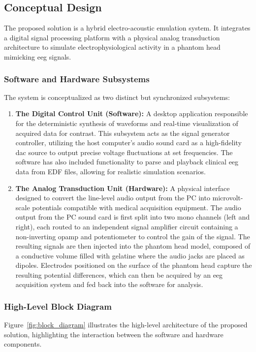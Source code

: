 \documentclass[../00_Main.tex]{subfiles}
\begin{document}
\subsection{Conceptual Design}
The proposed solution is a hybrid electro-acoustic emulation system. It integrates a digital signal processing platform with a physical analog transduction architecture to simulate electrophysiological activity in a phantom head mimicking \gls{eeg} signals.

\subsubsection{Software and Hardware Subsystems}
The system is conceptualized as two distinct but synchronized subsystems:

\begin{enumerate}
    \item \textbf{The Digital Control Unit (Software):} A desktop application responsible for the deterministic synthesis of waveforms and real-time visualization of acquired data for contrast. This subsystem acts as the signal generator controller, utilizing the host computer's audio sound card as a high-fidelity \gls{dac} source to output precise voltage fluctuations at set frequencies. The software has also included functionality to parse and playback clinical \gls{eeg} data from EDF files, allowing for realistic simulation scenarios.
    
    \item \textbf{The Analog Transduction Unit (Hardware):} A physical interface designed to convert the line-level audio output from the PC into microvolt-scale potentials compatible with medical acquisition equipment. The audio output from the PC sound card is first split into two mono channels (left and right), each routed to an independent signal amplifier circuit containing a non-inverting \gls{opamp} and potentiometer to control the gain of the signal. The resulting signals are then injected into the phantom head model, composed of a conductive volume filled with gelatine where the audio jacks are placed as dipoles. Electrodes positioned on the surface of the phantom head capture the resulting potential differences, which can then be acquired by an \gls{eeg} acquisition system and fed back into the software for analysis.
\end{enumerate}

\subsubsection{High-Level Block Diagram}
Figure~\ref{fig:block_diagram} illustrates the high-level architecture of the proposed solution, highlighting the interaction between the software and hardware components.
\end{document}
